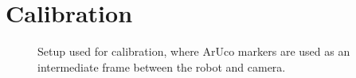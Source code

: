 \section{Calibration}\label{app:calibration}

\begin{figure}[ht]
    \centering
    \caption{Setup used for calibration, where ArUco markers are used as an intermediate frame between the robot and camera.}
\end{figure}
